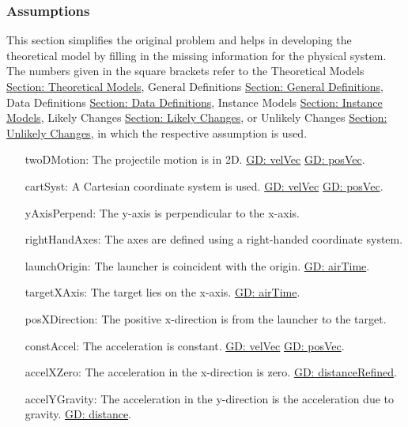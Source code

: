 \documentclass[12pt]{article}
\begin{document}
\subsubsection{Assumptions}
\label{Sec:Assumps}
This section simplifies the original problem and helps in developing the theoretical model by filling in the missing information for the physical system. The numbers given in the square brackets refer to the Theoretical Models \hyperref[Sec:TMs]{Section: Theoretical Models}, General Definitions \hyperref[Sec:GDs]{Section: General Definitions}, Data Definitions \hyperref[Sec:DDs]{Section: Data Definitions}, Instance Models \hyperref[Sec:IMs]{Section: Instance Models}, Likely Changes \hyperref[Sec:LCs]{Section: Likely Changes}, or Unlikely Changes \hyperref[Sec:UCs]{Section: Unlikely Changes}, in which the respective assumption is used.
\begin{itemize}
\item[twoDMotion:\phantomsection\label{twoDMotion}]The projectile motion is in 2D. \hyperref[GD:velVec]{GD: velVec} \hyperref[GD:posVec]{GD: posVec}.
\item[cartSyst:\phantomsection\label{cartSyst}]A Cartesian coordinate system is used. \hyperref[GD:velVec]{GD: velVec} \hyperref[GD:posVec]{GD: posVec}.
\item[yAxisPerpend:\phantomsection\label{yAxisPerpend}]The y-axis is perpendicular to the x-axis.
\item[rightHandAxes:\phantomsection\label{rightHandAxes}]The axes are defined using a right-handed coordinate system.
\item[launchOrigin:\phantomsection\label{launchOrigin}]The launcher is coincident with the origin. \hyperref[GD:airTime]{GD: airTime}.
\item[targetXAxis:\phantomsection\label{targetXAxis}]The target lies on the x-axis. \hyperref[GD:airTime]{GD: airTime}.
\item[posXDirection:\phantomsection\label{posXDirection}]The positive x-direction is from the launcher to the target.
\item[constAccel:\phantomsection\label{constAccel}]The acceleration is constant. \hyperref[GD:velVec]{GD: velVec} \hyperref[GD:posVec]{GD: posVec}.
\item[accelXZero:\phantomsection\label{accelXZero}]The acceleration in the x-direction is zero. \hyperref[GD:distanceRefined]{GD: distanceRefined}.
\item[accelYGravity:\phantomsection\label{accelYGravity}]The acceleration in the y-direction is the acceleration due to gravity. \hyperref[GD:distance]{GD: distance}.

\end{itemize}
\end{document}
